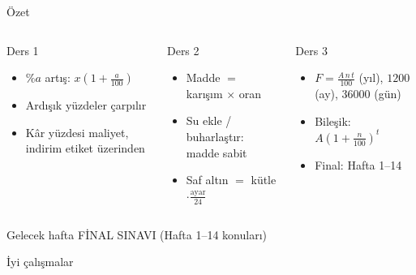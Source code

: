 \documentclass[aspectratio=169,11pt,handout]{beamer}
\begin{document}
\begin{frame}{Özet}
\begin{columns}[t]
\begin{block}{Ders 1}
\begin{itemize}
\item \(\%a\) artış: \(x(1+\frac{a}{100})\)
\item Ardışık yüzdeler çarpılır
\item Kâr yüzdesi maliyet, indirim etiket üzerinden
\end{itemize}
\end{block}
\begin{block}{Ders 2}
\begin{itemize}
\item Madde \(=\) karışım \(\times\) oran
\item Su ekle / buharlaştır: madde sabit
\item Saf altın \(=\) kütle \(\cdot\frac{\text{ayar}}{24}\)
\end{itemize}
\end{block}
\begin{block}{Ders 3}
\begin{itemize}
\item \(F=\frac{A\,n\,t}{100}\) (yıl), \(1200\) (ay), \(36000\) (gün)
\item Bileşik: \(A(1+\frac{n}{100})^t\)
\item Final: Hafta 1--14
\end{itemize}
\end{block}
\end{columns}
\vspace{6pt}
\begin{alertblock}{Gelecek hafta}
FİNAL SINAVI (Hafta 1--14 konuları)
\end{alertblock}
\end{frame}

\begin{frame}
\centering\Large İyi çalışmalar
\end{frame}
\end{document}
